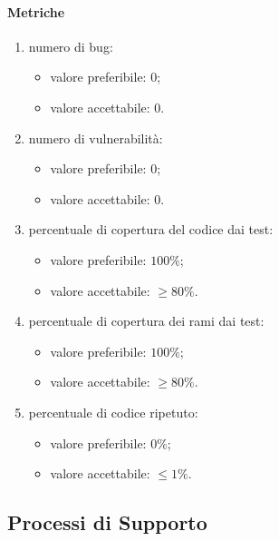         \paragraph{Metriche}
            \begin{enumerate}
                \item numero di bug:
                \begin{itemize}
                    \item valore preferibile: $0$;
                    \item valore accettabile: $0$.
                \end{itemize}
                \item numero di vulnerabilità:
                \begin{itemize}
                    \item valore preferibile: $0$;
                    \item valore accettabile: $0$.
                \end{itemize}
                \item percentuale di copertura del codice dai test:
                \begin{itemize}
                    \item valore preferibile: $100\%$;
                    \item valore accettabile: $\geq 80\%$.
                \end{itemize}
                \item percentuale di copertura dei rami dai test:
                \begin{itemize}
                    \item valore preferibile: $100\%$;
                    \item valore accettabile: $\geq 80\%$.
                \end{itemize}
                \item percentuale di codice ripetuto:
                \begin{itemize}
                    \item valore preferibile: $0\%$;
                    \item valore accettabile: $\leq 1\%$.
                \end{itemize}
            \end{enumerate}
\subsection{Processi di Supporto}

